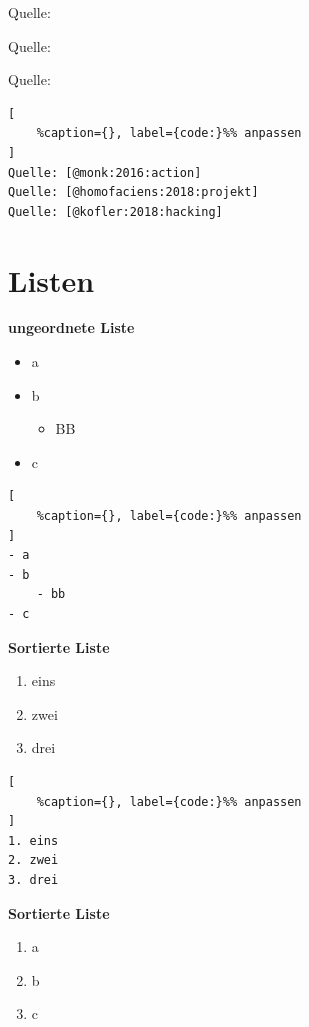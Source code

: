 Quelle: \textcite{spanner:2019:robotik}

Quelle: \textcite{homofaciens:2018:projekt}

Quelle: \textcite{kofler:2018:hacking}

\lstset{language=Python}%
\begin{lstlisting}[
	%caption={}, label={code:}%% anpassen
]
Quelle: [@monk:2016:action]
Quelle: [@homofaciens:2018:projekt]
Quelle: [@kofler:2018:hacking]
\end{lstlisting}

\section{Listen}\label{listen}

\textbf{ungeordnete Liste}

\begin{itemize}
\item
  a
\item
  b

  \begin{itemize}
  \item
    BB
  \end{itemize}
\item
  c
\end{itemize}

\lstset{language=Python}%
\begin{lstlisting}[
	%caption={}, label={code:}%% anpassen
]
- a
- b
    - bb
- c
\end{lstlisting}

\textbf{Sortierte Liste}

\begin{enumerate}
\item
  eins
\item
  zwei
\item
  drei
\end{enumerate}

\lstset{language=Python}%
\begin{lstlisting}[
	%caption={}, label={code:}%% anpassen
]
1. eins
2. zwei
3. drei
\end{lstlisting}

\textbf{Sortierte Liste}

\begin{enumerate}
\def\labelenumi{\alph{enumi})}
\item
  a
\item
  b
\item
  c
\end{enumerate}

